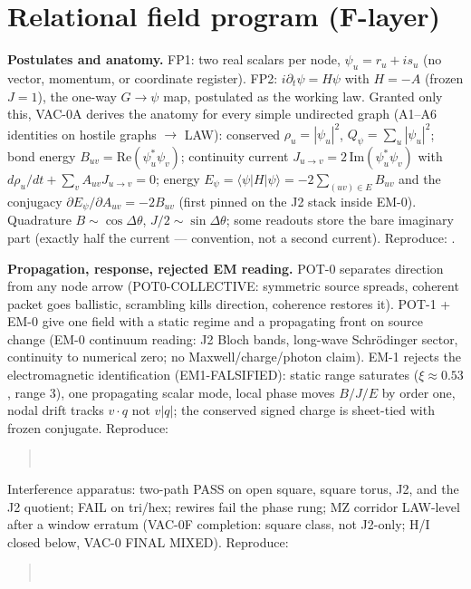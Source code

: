 \documentclass[11pt]{article}
\begin{document}
\section{Relational field program (F-layer)}
\label{sec:field}

\textbf{Postulates and anatomy.} FP1: two real scalars per node,
$\psi_u = r_u + i s_u$ (no vector, momentum, or coordinate register).
FP2: $i\partial_t\psi = H\psi$ with $H = -A$ (frozen $J = 1$), the
one-way $G \to \psi$ map, postulated as the working law. Granted only
this, VAC-0A derives the anatomy for every simple undirected graph
(A1--A6 identities on hostile graphs $\to$ LAW): conserved
$\rho_u = |\psi_u|^2$, $Q_\psi = \sum_u|\psi_u|^2$; bond energy
$B_{uv} = \mathrm{Re}(\psi^*_u\psi_v)$; continuity current
$J_{u\to v} = 2\,\mathrm{Im}(\psi^*_u\psi_v)$ with
$d\rho_u/dt + \sum_v A_{uv}J_{u\to v} = 0$; energy
$E_\psi = \langle\psi|H|\psi\rangle = -2\sum_{(uv)\in E}B_{uv}$ and the
conjugacy $\partial E_\psi/\partial A_{uv} = -2B_{uv}$ (first pinned on
the J2 stack inside EM-0). Quadrature $B \sim \cos\Delta\theta$,
$J/2 \sim \sin\Delta\theta$; some readouts store the bare imaginary
part (exactly half the current --- convention, not a second current).
Reproduce: .

\textbf{Propagation, response, rejected EM reading.} POT-0 separates
direction from any node arrow (POT0-COLLECTIVE: symmetric source
spreads, coherent packet goes ballistic, scrambling kills direction,
coherence restores it). POT-1 + EM-0 give one field with a static
regime and a propagating front on source change (EM-0 continuum
reading: J2 Bloch bands, long-wave Schr\"odinger sector, continuity to
numerical zero; no Maxwell/charge/photon claim). EM-1 rejects the
electromagnetic identification (EM1-FALSIFIED): static range saturates
($\xi \approx 0.53$, range 3), one propagating scalar mode, local phase
moves $B/J/E$ by order one, nodal drift tracks $v\cdot q$ not $v|q|$;
the conserved signed charge is sheet-tied with frozen conjugate.
Reproduce:
\begin{quote}\small
{}\\
\end{quote}
Interference apparatus: two-path PASS on open square, square torus, J2,
and the J2 quotient; FAIL on tri/hex; rewires fail the phase rung; MZ
corridor LAW-level after a window erratum (VAC-0F completion: square class,
not J2-only; H/I closed below, VAC-0 FINAL MIXED).
Reproduce:
\begin{quote}\small
{}\\
\end{quote}
\end{document}
